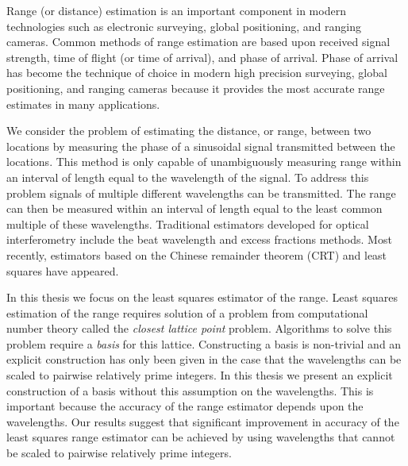  \label{Summary}
 

Range (or distance) estimation is an important component in modern technologies such as electronic surveying, global positioning, and ranging cameras. Common methods of range estimation are based upon received signal strength, time of flight (or time of arrival), and phase of arrival. Phase of arrival has become the technique of choice in modern high precision surveying, global positioning, and ranging cameras because it provides the most accurate range estimates in many applications.
 
We consider the problem of estimating the distance, or range, between two locations by measuring the phase of a sinusoidal signal transmitted between the locations. This method is only capable of unambiguously measuring range within an interval of length equal to the wavelength of the signal. To address this problem signals of multiple different wavelengths can be transmitted.  The range can then be measured within an interval of length equal to the least common multiple of these wavelengths. Traditional estimators developed for optical interferometry include the beat wavelength and excess fractions methods.  Most recently, estimators based on the Chinese remainder theorem (CRT) and least squares have appeared.

In this thesis we focus on the least squares estimator of the range. Least squares estimation of the range requires solution of a problem from computational number theory called the \emph{closest lattice point} problem.  Algorithms to solve this problem require a \emph{basis} for this lattice.  Constructing a basis is non-trivial and an explicit construction has only been given in the case that the wavelengths can be scaled to pairwise relatively prime integers.  In this thesis we present an explicit construction of a basis without this assumption on the wavelengths.  This is important because the accuracy of the range estimator depends upon the wavelengths.  Our results suggest that significant improvement in accuracy of the least squares range estimator can be achieved by using wavelengths that cannot be scaled to pairwise relatively prime integers.
 
